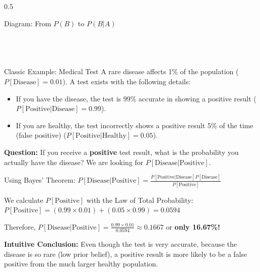 \begin{frame}
\begin{columns}[T]
\begin{column}{0.5\textwidth}
\begin{block}{Diagram: From \(P(B)\) to \(P(B|A)\)}
            \end{block}
        \end{column}
    \end{columns}
\end{frame}

\begin{frame}
\frametitle{\ }
\vspace{-7mm}
\footnotesize
  \begin{exampleblock}{Classic Example: Medical Test}
    A rare disease affects 1\% of the population ($P[\text{Disease}] = 0.01$). A test exists with the following details:
    \begin{itemize}
        \item If you have the disease, the test is 99\% accurate in showing a positive result ($P[\text{Positive}|\text{Disease}] = 0.99$).
        \item If you are healthy, the test incorrectly shows a positive result 5\% of the time (false positive) ($P[\text{Positive}|\text{Healthy}] = 0.05$).
    \end{itemize}
    \textbf{Question:} If you receive a \textbf{positive} test result, what is the probability you actually have the disease? We are looking for $P[\text{Disease}|\text{Positive}]$.
    
    \medskip
    
    Using Bayes' Theorem:
    $P[\text{Disease}|\text{Positive}] = \frac{P[\text{Positive}|\text{Disease}] P[\text{Disease}]}{P[\text{Positive}]}$
    
    We calculate $P[\text{Positive}]$ with the Law of Total Probability:
    $P[\text{Positive}] = (0.99 \times 0.01) + (0.05 \times 0.99) = 0.0594$
    
    Therefore, $P[\text{Disease}|\text{Positive}] = \frac{0.99 \times 0.01}{0.0594} \approx 0.1667$ or \textbf{only 16.67\%!}

    \medskip
    
    \textbf{Intuitive Conclusion:} Even though the test is very accurate, because the disease is so rare (low prior belief), a positive result is more likely to be a false positive from the much larger healthy population.
  \end{exampleblock}
\end{frame}

